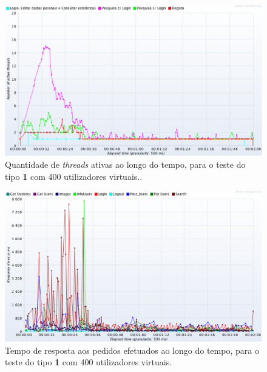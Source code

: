 \begin{figure}[H]
    \centering
    \includegraphics[width=1\textwidth]{images/Testes/4PCT400.png}
    \caption{Quantidade de \textit{threads} ativas ao longo do tempo, para o teste do tipo \textbf{1} com 400 utilizadores virtuais..}
    \label{fig:4PC_400_threads}
\end{figure}

\begin{figure}[H]
    \centering
    \includegraphics[width=1\textwidth]{images/Testes/4PCR400.png}
    \caption{Tempo de resposta aos pedidos efetuados ao longo do tempo, para o teste do tipo \textbf{1} com 400 utilizadores virtuais.}
    \label{fig:4PC_400_response}
\end{figure}


